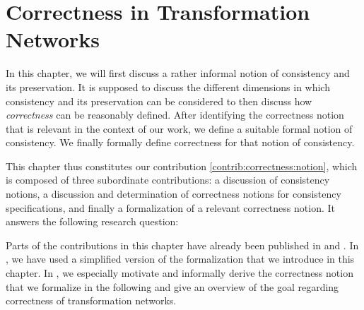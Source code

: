 \chapter{Correctness in Transformation Networks
}
\label{chap:correctness}




In this chapter, we will first discuss a rather informal notion of consistency and its preservation. It is supposed to discuss the different dimensions in which consistency and its preservation can be considered to then discuss how \emph{correctness} can be reasonably defined.
After identifying the correctness notion that is relevant in the context of our work, we define a suitable formal notion of consistency.
We finally formally define correctness for that notion of consistency.

This chapter thus constitutes our contribution \autoref{contrib:correctness:notion}, which is composed of three subordinate contributions: a discussion of consistency notions, a discussion and determination of correctness notions for consistency specifications, and finally a formalization of a relevant correctness notion.
It answers the following research question:


Parts of the contributions in this chapter have already been published in  and .
In , we have used a simplified version of the formalization that we introduce in this chapter.
In , we especially motivate and informally derive the correctness notion that we formalize in the following and give an overview of the goal regarding correctness of transformation networks.






